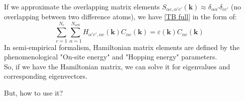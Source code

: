 \documentclass{beamer}
\begin{document}
\begin{frame}
\quad If we approximate the overlapping matrix elements $S_{\alpha c,\alpha' c'}(\textbf{k}) \approx \delta_{\alpha\alpha'} \delta_{c c'}$ (no overlapping between two difference atoms), we have \eqref{TB full} in the form of:
	\begin{equation}
		\sum_{c = 1}^{N_c} \sum_{\alpha = 1}^{N_{orb}} H_{\alpha' c',\alpha c}(\textbf{k}) C_{\alpha c}(\textbf{k}) = \varepsilon(\textbf{k}) C_{\alpha c}(\textbf{k})
	\end{equation}
\quad In semi-empirical formalism, Hamiltonian matrix elements are defined by the phenomenological "On-site energy" and "Hopping energy" parameters.\\
\quad So, if we have the Hamiltonian matrix, we can solve it for eigenvalues and corresponding eigenvectors.
\begin{center}
	But, how to use it? 
\end{center}
\end{frame}
\end{document}

